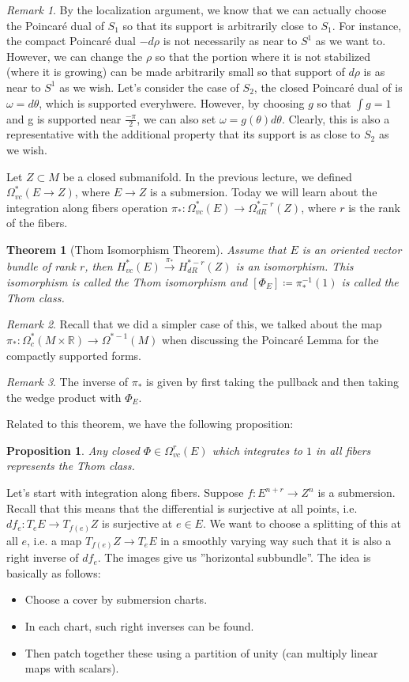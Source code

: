 \documentclass[12pt]{amsart}
\newtheorem{proposition}{Proposition}
\newtheorem{theorem}{Theorem}
\newcommand{\R}{\mathbb{R}} %
\theoremstyle{remark}
\newtheorem{remark}{Remark}
\begin{document}
\begin{remark}
By the localization argument, we know that we can actually choose the Poincaré dual of $S_1$ so that its support is arbitrarily close to $S_1$. For instance, the compact Poincaré dual $-d\rho$ is not necessarily as near to $S^1$ as we want to. However, we can change the $\rho$ so that the portion where it is not stabilized (where it is growing) can be made arbitrarily small so that support of $d\rho$ is as near to $S^1$ as we wish. Let's consider the case of $S_2$, the closed Poincaré dual of is $\omega=d\theta$, which is supported everyhwere. However, by choosing $g$ so that $\int g=1$ and g is supported near $\frac{-\pi}{2}$, we can also set $\omega=g(\theta)d\theta$. Clearly, this is also a representative with the additional property that its support is as close to $S_2$ as we wish.
\end{remark}
Let $Z\subset M$ be a closed submanifold. In the previous lecture, we defined $\Omega^*_{vc}(E\to Z)$, where $E\to Z$ is a submersion. Today we will learn about the integration along fibers operation $\pi_*:\Omega^*_{vc}(E)\to \Omega^{*-r}_{dR}(Z)$, where $r$ is the rank of the fibers.
 \begin{theorem}[Thom Isomorphism Theorem]
Assume that $E$ is an oriented vector bundle of rank $r$, then $H^*_{vc}(E)\xrightarrow{\pi_*} H^{*-r}_{dR}(Z)$ is an isomorphism. This isomorphism is called the Thom isomorphism and  $[\Phi_E]\coloneqq\pi_*^{-1}(1)$ is called the Thom class.
\end{theorem}
\begin{remark}
Recall that we did a simpler case of this, we talked about the map $\pi_*: \Omega_c^*\left(M \times \R\right) \rightarrow \Omega^{*-1}(M)$ when discussing the Poincaré Lemma for the compactly supported forms. 
\end{remark}
\begin{remark}
The inverse of $\pi_*$ is given by first taking the pullback and then taking the wedge product with $\Phi_E$.
\end{remark}
Related to this theorem, we have the following proposition:
\begin{proposition}
Any closed $\Phi\in \Omega^r_{vc}(E)$ which integrates to $1$ in all fibers represents the Thom class.
\end{proposition} 

Let's start with integration along fibers. Suppose $f:E^{n+r}\to Z^n$ is a submersion.  Recall that this means that the differential is surjective at all points, i.e. $df_e:T_eE\to T_{f(e)}Z$ is surjective at $e\in E$. We want to choose a splitting of this at all $e$, i.e. a map $T_{f(e)}Z\to T_eE$ in a smoothly varying way such that it is also a right inverse of $df_e$. The images give us ''horizontal subbundle''. The idea is basically as follows:
\begin{itemize}
\item Choose a cover by submersion charts. 
\item In each chart, such right inverses can be found.
\item Then patch together these using a partition of unity (can multiply linear maps with scalars).
\end{itemize}
\end{document}
